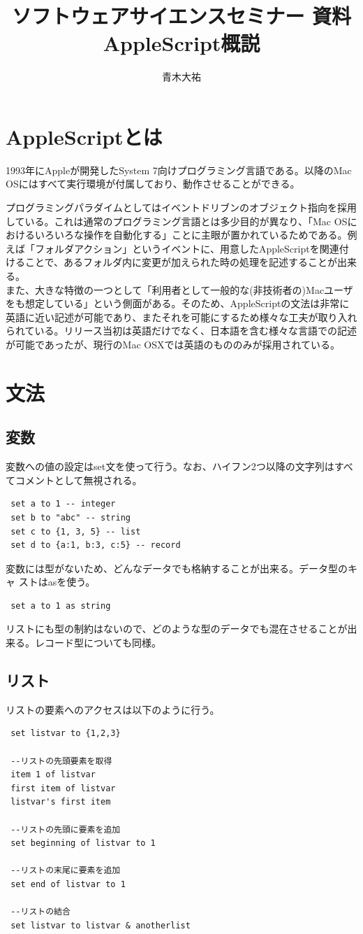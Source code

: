 \documentclass[a4paper,7pt]{jsarticle}
\title{ソフトウェアサイエンスセミナー 資料 \\{\large{AppleScript概説}}}
\author{青木大祐}
\begin{document}
\maketitle
\section{AppleScriptとは}
1993年にAppleが開発したSystem 7向けプログラミング言語である。以降のMac
OSにはすべて実行環境が付属しており、動作させることができる。

プログラミングパラダイムとしてはイベントドリブンのオブジェクト指向を採用
している。これは通常のプログラミング言語とは多少目的が異なり、「Mac OSに
おけるいろいろな操作を自動化する」ことに主眼が置かれているためである。例
えば「フォルダアクション」というイベントに、用意したAppleScriptを関連付
けることで、あるフォルダ内に変更が加えられた時の処理を記述することが出来
る。\\

また、大きな特徴の一つとして「利用者として一般的な(非技術者の)Macユーザ
をも想定している」という側面がある。そのため、AppleScriptの文法は非常に
英語に近い記述が可能であり、またそれを可能にするため様々な工夫が取り入れ
られている。リリース当初は英語だけでなく、日本語を含む様々な言語での記述
が可能であったが、現行のMac OSXでは英語のもののみが採用されている。

\section{文法}
\subsection{変数}
変数への値の設定はset文を使って行う。なお、ハイフン2つ以降の文字列はすべ
てコメントとして無視される。
\begin{lstlisting}
 set a to 1 -- integer
 set b to "abc" -- string
 set c to {1, 3, 5} -- list
 set d to {a:1, b:3, c:5} -- record
\end{lstlisting}
変数には型がないため、どんなデータでも格納することが出来る。データ型のキャ
ストはasを使う。
\begin{lstlisting}
 set a to 1 as string
\end{lstlisting}
リストにも型の制約はないので、どのような型のデータでも混在させることが出
来る。レコード型についても同様。
\subsection{リスト}
リストの要素へのアクセスは以下のように行う。
\begin{lstlisting}
 set listvar to {1,2,3}

 --リストの先頭要素を取得
 item 1 of listvar
 first item of listvar
 listvar's first item

 --リストの先頭に要素を追加
 set beginning of listvar to 1

 --リストの末尾に要素を追加
 set end of listvar to 1

 --リストの結合
 set listvar to listvar & anotherlist
\end{lstlisting}
\end{document}
